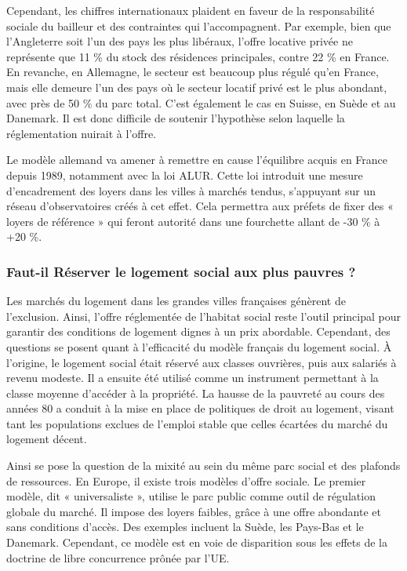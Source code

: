 \documentclass[a4paper, 12pt]{report}
\begin{document}
Cependant, les chiffres internationaux plaident en faveur de la responsabilité sociale du bailleur et des contraintes qui l'accompagnent. Par exemple, bien que l’Angleterre soit l’un des pays les plus libéraux, l’offre locative privée ne représente que 11 \% du stock des résidences principales, contre 22 \% en France. En revanche, en Allemagne, le secteur est beaucoup plus régulé qu’en France, mais elle demeure l’un des pays où le secteur locatif privé est le plus abondant, avec près de 50 \% du parc total. C’est également le cas en Suisse, en Suède et au Danemark. Il est donc difficile de soutenir l’hypothèse selon laquelle la réglementation nuirait à l’offre.

Le modèle allemand va amener à remettre en cause l’équilibre acquis en France depuis 1989, notamment avec la loi ALUR. Cette loi introduit une mesure d’encadrement des loyers dans les villes à marchés tendus, s’appuyant sur un réseau d’observatoires créés à cet effet. Cela permettra aux préfets de fixer des « loyers de référence » qui feront autorité dans une fourchette allant de -30 \% à +20 \%.

\subsubsection{Faut-il Réserver le logement social aux plus pauvres ?}

Les marchés du logement dans les grandes villes françaises génèrent de l’exclusion. Ainsi, l’offre réglementée de l’habitat social reste l’outil principal pour garantir des conditions de logement dignes à un prix abordable. Cependant, des questions se posent quant à l’efficacité du modèle français du logement social. À l’origine, le logement social était réservé aux classes ouvrières, puis aux salariés à revenu modeste. Il a ensuite été utilisé comme un instrument permettant à la classe moyenne d’accéder à la propriété. La hausse de la pauvreté au cours des années 80 a conduit à la mise en place de politiques de droit au logement, visant tant les populations exclues de l’emploi stable que celles écartées du marché du logement décent.

Ainsi se pose la question de la mixité au sein du même parc social et des plafonds de ressources. En Europe, il existe trois modèles d’offre sociale. Le premier modèle, dit « universaliste », utilise le parc public comme outil de régulation globale du marché. Il impose des loyers faibles, grâce à une offre abondante et sans conditions d’accès. Des exemples incluent la Suède, les Pays-Bas et le Danemark. Cependant, ce modèle est en voie de disparition sous les effets de la doctrine de libre concurrence prônée par l’UE.
\end{document}
